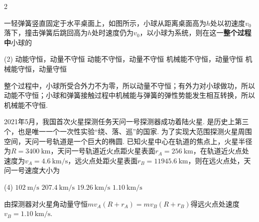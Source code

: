 \begin{paracol}{2}
\begin{problem}
    一轻弹簧竖直固定于水平桌面上，如图所示，小球从距离桌面高为$h$处以初速度$v_0$落下，撞击弹簧后跳回高为$h$处时速度仍为$v_0$，以小球为系统，则在这一\textbf{整个过程中}小球的
    \begin{tasks}(2)
        \task 动能守恒，动量不守恒
        \task[\true] 动能不守恒，动量不守恒
        \task 机械能不守恒，动量守恒
        \task 机械能守恒，动量守恒
    \end{tasks}
    \switchcolumn\vspace*{\fill}\centering
    \vspace*{\fill}
\end{problem}
\end{paracol}
\begin{solution}
    整个过程中，小球所受合外力不为零，所以动量不守恒；有外力对小球做功，所以动能不守恒；小球和弹簧接触过程中机械能与弹簧的弹性势能发生相互转换，所以机械能不守恒.
\end{solution}

\begin{problem}
    2021年5月，我国首次火星探测任务天问一号探测器成功着陆火星. 是历史上第三个，也是唯一一个一次性实验``绕、落、巡''的国家. 为了实现大范围探测火星周围空间，天问一号轨道是一个巨大的椭圆. 已知火星中心在轨道的焦点上，火星半径为$R=\qty{3400}\km$，天问一号轨道近火点距火星表面$r_A=\qty{256}\km$，在轨道近火点处速度为$v_A=\qty{4.6}{\km/\s}$，远火点处距火星表面$r_B=\qty{11945.6}\km$，则在远火点处，天问一号速度大小为
    \begin{tasks}(4)
        \task $\qty{102}{\m/\s}$
        \task $\qty{207.4}{\km/\s}$
        \task $\qty{19.26}{\km/\s}$
        \task[\true] $\qty{1.10}{\km/\s}$
    \end{tasks}
\end{problem}
\begin{solution}
    由探测器对火星角动量守恒$mv_A(R+r_A)=mv_B(R+r_B)$得远火点处速度$v_B=\qty{1.10}{\km/\s}$.
\end{solution}

